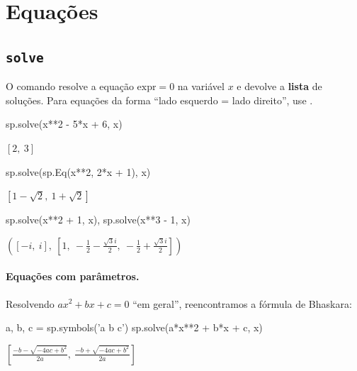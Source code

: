 \section{Equações}

\subsection{\texttt{solve}}

O comando  resolve a equação $\text{expr}=0$ na variável $x$ e devolve a \textbf{lista}
de soluções. Para equações da forma ``lado esquerdo = lado direito'', use .

\begin{entrada}
sp.solve(x**2 - 5*x + 6, x)
\end{entrada}
\begin{saidamat}
$\displaystyle \left[ 2, \  3\right]$
\end{saidamat}

\begin{entrada}
sp.solve(sp.Eq(x**2, 2*x + 1), x)
\end{entrada}
\begin{saidamat}
$\displaystyle \left[ 1 - \sqrt{2}, \  1 + \sqrt{2}\right]$
\end{saidamat}

\begin{entrada}
sp.solve(x**2 + 1, x), sp.solve(x**3 - 1, x)
\end{entrada}
\begin{saidamat}
$\displaystyle \left( \left[ - i, \  i\right], \  \left[ 1, \  - \frac{1}{2} - \frac{\sqrt{3} i}{2}, \  - \frac{1}{2} + \frac{\sqrt{3} i}{2}\right]\right)$
\end{saidamat}

\paragraph{Equações com parâmetros.} Resolvendo $ax^2+bx+c=0$ ``em geral'', reencontramos a fórmula de Bhaskara:

\begin{entrada}
a, b, c = sp.symbols('a b c')
sp.solve(a*x**2 + b*x + c, x)
\end{entrada}
\begin{saidamat}
$\displaystyle \left[ \frac{- b - \sqrt{- 4 a c + b^{2}}}{2 a}, \  \frac{- b + \sqrt{- 4 a c + b^{2}}}{2 a}\right]$
\end{saidamat}


